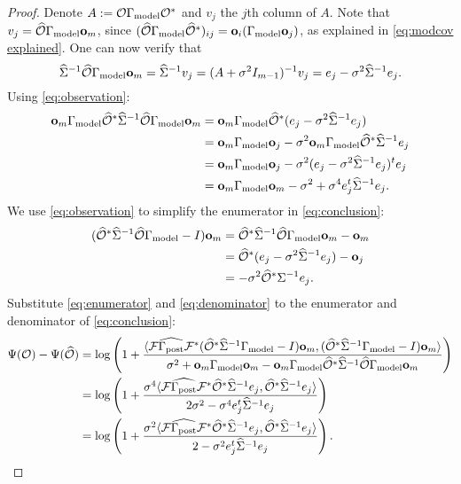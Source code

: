 \begin{proof} \label{cor:same meas proof}
  Denote $A:= \mathcal{O} \Gamma_{\textup{model}} \mathcal{O}^*$ and $v_j$ the $j$th column of $A$.
  Note that $v_j = \widehat{\mathcal{O}} \Gamma_{\textup{model}} \mathbf{o}_m$, since $(\widehat{\mathcal{O}} \Gamma_{\textup{model}}
  \widehat{\mathcal{O}}^*)_{ij} = \mathbf{o}_i(\Gamma_{\textup{model}} \mathbf{o}_j)$, as explained in
  \eqref{eq:modcov explained}. One can now verify that
  \begin{equation}\label{eq:observation}
    \widehat{\Sigma}^{-1} \widehat{\mathcal{O}} \Gamma_{\textup{model}} \mathbf{o}_m = \widehat{\Sigma}^{-1}v_j = (A +\sigma^2I_{m-1})^{-1} v_j =
    e_j -\sigma^2 \widehat{\Sigma}^{-1}e_j.
  \end{equation}
  Using \eqref{eq:observation}:
  \begin{align}\label{eq:denominator}
    \begin{split}
      \mathbf{o}_m \Gamma_{\textup{model}} \widehat{\mathcal{O}}^* \widehat{\Sigma}^{-1} \widehat{\mathcal{O}} \Gamma_{\textup{model}} \mathbf{o}_m
      &= \mathbf{o}_m \Gamma_{\textup{model}} \widehat{\mathcal{O}}^* ( e_j - \sigma^2 \widehat{\Sigma}^{-1} e_j )\\
      &= \mathbf{o}_m \Gamma_{\textup{model}} \mathbf{o}_j - \sigma^2 \mathbf{o}_m \Gamma_{\textup{model}} \widehat{\mathcal{O}}^* \widehat{\Sigma}^{-1}e_j \\
      &= \mathbf{o}_m \Gamma_{\textup{model}} \mathbf{o}_j -\sigma^2 (e_j - \sigma^2 \widehat{\Sigma}^{-1}e_j)^t e_j \\
      &= \mathbf{o}_m \Gamma_{\textup{model}} \mathbf{o}_m -\sigma^2 + \sigma^4 e_j^t\widehat{\Sigma}^{-1}e_j.
    \end{split}
  \end{align}
  We use \eqref{eq:observation} to simplify the enumerator in
  \eqref{eq:conclusion}:
  \begin{align}\label{eq:enumerator}
    \begin{split}
      (\widehat{\mathcal{O}}^* \widehat{\Sigma}^{-1} \widehat{\mathcal{O}} \Gamma_{\textup{model}} - I ) \mathbf{o}_m
      &= \widehat{\mathcal{O}}^* \widehat{\Sigma}^{-1} \widehat{\mathcal{O}} \Gamma_{\textup{model}} \mathbf{o}_m - \mathbf{o}_m \\
      &= \widehat{\mathcal{O}}^* (e_j - \sigma^2 \widehat{\Sigma}^{-1} e_j) -\mathbf{o}_j \\ 
      &= -\sigma^2 \widehat{\mathcal{O}}^* \Sigma^{-1}e_j. 
    \end{split}
  \end{align}
  Substitute \eqref{eq:enumerator} and \eqref{eq:denominator} to the
  enumerator and denominator of \eqref{eq:conclusion}:
  \begin{align*}
    \Psi( \mathcal{O} ) - \Psi (\widehat{\mathcal{O}} ) &=
    \log \left ( 1 + \frac{
      \langle \mathcal{F} \widehat{\Gamma_{\textup{post}}} \mathcal{F}^* (\widehat{\mathcal{O}}^* \widehat{\Sigma}^{-1} \Gamma_{\textup{model}} - I ) \mathbf{o}_m,
      (\widehat{\mathcal{O}}^* \widehat{\Sigma}^{-1} \Gamma_{\textup{model}} - I ) \mathbf{o}_m \rangle
    }{
      \sigma^2 + \mathbf{o}_m \Gamma_{\textup{model}} \mathbf{o}_m - \mathbf{o}_m \Gamma_{\textup{model}} \widehat{\mathcal{O}}^* \widehat{\Sigma}^{-1} \widehat{\mathcal{O}} \Gamma_{\textup{model}} \mathbf{o}_m 
    }       
    \right ) \\
    &= \log \left ( 1 + \frac{\sigma^4
      \langle \mathcal{F} \widehat{\Gamma_{\textup{post}}} \mathcal{F}^* \widehat{\mathcal{O}}^* \widehat{\Sigma}^{-1} e_j,
      \widehat{\mathcal{O}}^* \widehat{\Sigma}^{-1}e_j \rangle
    }{
      2\sigma^2 - \sigma^4 e_j^t\widehat{\Sigma}^{-1}e_j 
    }       
    \right ) \\
    &= \log \left ( 1 + \frac{\sigma^2
      \langle \mathcal{F} \widehat{\Gamma_{\textup{post}}} \mathcal{F}^* \widehat{\mathcal{O}}^* \widehat{\Sigma}^{-1} e_j,
      \widehat{\mathcal{O}}^* \widehat{\Sigma}^{-1}e_j \rangle
    }{
      2 - \sigma^2 e_j^t\widehat{\Sigma}^{-1}e_j 
    }       
    \right ).
  \end{align*}
\end{proof}



